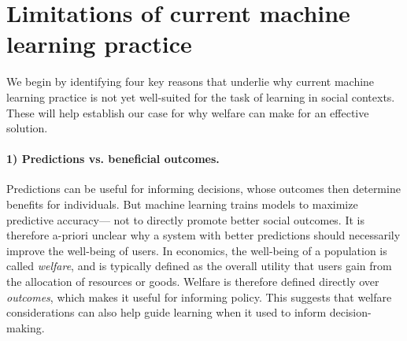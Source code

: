 
\iffalse 
{%
\section{Limitations of current machine learning practice}

We begin by identifying four key reasons that underlie why current machine learning practice is not yet well-suited for the task of learning in social contexts.
These will help establish our case for why welfare can make for an effective solution.


\paragraph{1) Predictions vs. beneficial outcomes.}
Predictions can be useful for informing decisions,
whose outcomes then determine benefits for individuals.
But machine learning trains models to maximize predictive accuracy---%
not to directly promote better 
social outcomes.
It is therefore a-priori unclear why a system with better predictions should necessarily
improve 
the well-being of users.
In economics, the well-being of a population is called \emph{welfare},
and is typically defined as the overall utility that users gain from the allocation of resources or goods.
Welfare is therefore defined directly over \emph{outcomes}, which makes it useful for informing policy.
This suggests that welfare considerations can also help guide learning when it used to inform decision-making.






}
